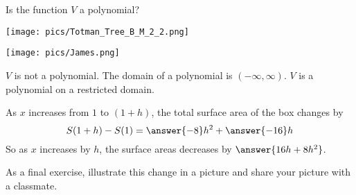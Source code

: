 \documentclass{ximera}
\author{Nela Lakos \and Bart Snapp}
\begin{document}
\begin{exercise}
  Is the function $V$ a polynomial?
  
  
  \begin{image}
  \texttt{[image: pics/Totman\_Tree\_B\_M\_2\_2.png]}
\end{image}


  \begin{image}
  \texttt{[image: pics/James.png]}
\end{image}



  \begin{multipleChoice}
  \end{multipleChoice}
  \begin{feedback}
    $V$ is not a polynomial. The domain of a polynomial is
    $(-\infty,\infty)$. $V$ is a polynomial on a restricted domain.
  \end{feedback}
\end{exercise}







\begin{exercise}
  As $x$ increases from $1$ to $(1+h)$, the total surface area of the
  box changes by
  \[
  S(1+h) - S(1) = \answer{-8}h^2 + \answer{-16}h
  \]
  So as $x$ increases by $h$, the surface areas decreases by
  $\answer{16h+8h^2}$.

  As a final exercise, illustrate this change in a picture and share your picture with a classmate.
  \begin{multipleChoice}
  \end{multipleChoice}
\end{exercise}
\end{document}
